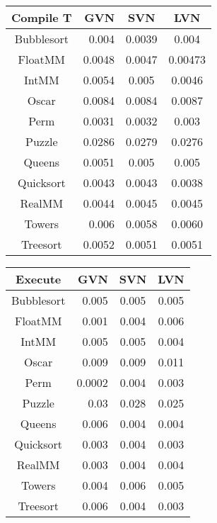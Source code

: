 \begin{center}
\begin{tabular}{|c|r|c|c|}
\hline
Compile T & GVN  & SVN  & LVN\\ 
\hline
Bubblesort & 0.004 & 0.0039 & 0.004  \\
\hline
FloatMM & 0.0048 & 0.0047 & 0.00473  \\
\hline
IntMM & 0.0054 & 0.005 & 0.0046 \\
\hline
Oscar & 0.0084 & 0.0084 & 0.0087 \\
\hline
Perm & 0.0031 & 0.0032 & 0.003 \\
\hline
Puzzle & 0.0286 & 0.0279 & 0.0276\\
\hline
Queens & 0.0051 & 0.005 & 0.005  \\
\hline
Quicksort & 0.0043 & 0.0043 & 0.0038\\
\hline
RealMM & 0.0044 & 0.0045 & 0.0045 \\
\hline
Towers & 0.006 & 0.0058 & 0.0060  \\
\hline
Treesort & 0.0052 & 0.0051 & 0.0051\\
\hline
\end{tabular}
\end{center}
\begin{center}
\begin{tabular}{|c|r|c|c|}
\hline
Execute & GVN  & SVN  & LVN \\
\hline
Bubblesort & 0.005 & 0.005 & 0.005  \\
\hline
FloatMM & 0.001 & 0.004 & 0.006  \\
\hline
IntMM & 0.005  & 0.005 & 0.004 \\
\hline
Oscar & 0.009 & 0.009 & 0.011 \\
\hline
Perm & 0.0002 & 0.004 & 0.003 \\
\hline
Puzzle & 0.03 & 0.028  & 0.025\\
\hline
Queens & 0.006 & 0.004 & 0.004  \\
\hline
Quicksort & 0.003 & 0.004 & 0.003\\
\hline
RealMM & 0.003 & 0.004 & 0.004 \\
\hline
Towers & 0.004 & 0.006 & 0.005  \\
\hline
Treesort & 0.006 & 0.004  & 0.003\\
\hline
\end{tabular}
\end{center}


